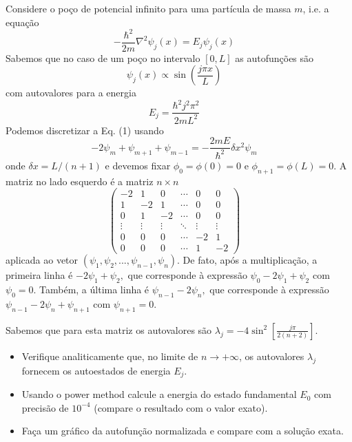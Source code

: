 \documentclass[12pt, a4paper]{article} %
\begin{document}
        Considere o poço de potencial infinito para uma partícula de massa $m$, i.e. a equação
        $$-\frac{\hbar^{2}}{2m}\nabla^2\psi_{j}(x)=E_{j}\psi_{j}(x) \quad \text{}$$
        Sabemos que no caso de um poço no intervalo $[0, L]$ as autofunções são
        $$ \psi_{j}(x)\propto \sin\left(\frac{j\pi x}{L}\right) \quad \text{}$$
        com autovalores para a energia
        $$ E_{j}=\frac{\hbar^{2}j^{2}\pi^{2}}{2mL^{2}} \quad \text{}$$
        Podemos discretizar a Eq. (1) %
        usando 
        $$ -2\psi_{m}+\psi_{m+1}+\psi_{m-1}=-\frac{2mE}{\hbar^{2}}\delta x^{2}\psi_{m} \quad \text{}$$
        onde $\delta x=L/(n+1)$ e devemos fixar $\phi_{0}=\phi(0)=0$ e $\phi_{n+1}=\phi(L)=0$. 
        A matriz no lado esquerdo é a matriz $n\times n$ 
        $$
        \begin{pmatrix}
        -2 & 1 & 0 & \cdots & 0 & 0 \\
        1 & -2 & 1 & \cdots & 0 & 0 \\
        0 & 1 & -2 & \cdots & 0 & 0 \\
        \vdots & \vdots & \vdots & \ddots & \vdots & \vdots \\
        0 & 0 & 0 & \cdots & -2 & 1 \\
        0 & 0 & 0 & \cdots & 1 & -2
        \end{pmatrix}
        \quad \text{}
        $$
        aplicada ao vetor $(\psi_{1},\psi_{2},...,\psi_{n-1},\psi_{n})$. De fato, após a multiplicação, a primeira linha é $-2\psi_{1}+\psi_{2},$ que corresponde à expressão $\psi_{0}-2\psi_{1}+\psi_{2}$ com $\psi_{0}=0$. Também, a última linha é $\psi_{n-1}-2\psi_{n},$ que corresponde à expressão $\psi_{n-1}-2\psi_{n}+\psi_{n+1}$ com $\psi_{n+1}=0$. 
        
        Sabemos que para esta matriz os autovalores são $\lambda_{j}=-4\sin^{2}\left[\frac{j\pi}{2(n+2)}\right]$. \quad 
        
        \begin{itemize}
            \item Verifique analiticamente que, no limite de $n\rightarrow+\infty$, os autovalores $\lambda_{j}$ fornecem os autoestados de energia $E_{j}.$ 
            \item Usando o power method calcule a energia do estado fundamental $E_{0}$ com precisão de $10^{-4}$ (compare o resultado com o valor exato). 
            \item Faça um gráfico da autofunção normalizada e compare com a solução exata. 
        \end{itemize}
\end{document}
